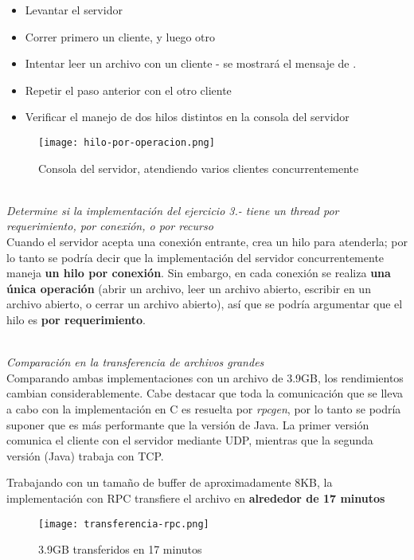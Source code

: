 \begin{itemize}
    \item Levantar el servidor
    \item Correr primero un cliente, y luego otro
    \item Intentar leer un archivo con un cliente - se mostrará el mensaje de .
    \item Repetir el paso anterior con el otro cliente
    \item Verificar el manejo de dos hilos distintos en la consola del servidor
\end{itemize}

\begin{figure}[H]
    \centering
    \texttt{[image: hilo-por-operacion.png]}
    \caption{Consola del servidor, atendiendo varios clientes concurrentemente}
\end{figure}

~\\
\emph{Determine si la implementación del ejercicio 3.- tiene un thread por requerimiento, por conexión, o por recurso} 
~\\

Cuando el servidor acepta una conexión entrante, crea un hilo para atenderla; por lo tanto se podría decir que la implementación del servidor concurrentemente maneja \textbf{un hilo por conexión}. Sin embargo, en cada conexión se realiza \textbf{una única operación} (abrir un archivo, leer un archivo abierto, escribir en un archivo abierto, o cerrar un archivo abierto), así que se podría argumentar que el hilo es \textbf{por requerimiento}. 

~\\
\emph{Comparación en la transferencia de archivos grandes} 
~\\

Comparando ambas implementaciones con un archivo de 3.9GB, los rendimientos cambian considerablemente. Cabe destacar que toda la comunicación que se lleva a cabo con la implementación en C es resuelta por \emph{rpcgen}, por lo tanto se podría suponer que es más performante que la versión de Java. La primer versión comunica el cliente con el servidor mediante UDP, mientras que la segunda versión (Java) trabaja con TCP.

Trabajando con un tamaño de buffer de aproximadamente 8KB, la implementación con RPC transfiere el archivo en \textbf{alrededor de 17 minutos} 

\begin{figure}[h]
    \centering
    \texttt{[image: transferencia-rpc.png]}
    \caption{3.9GB transferidos en 17 minutos}
\end{figure}

